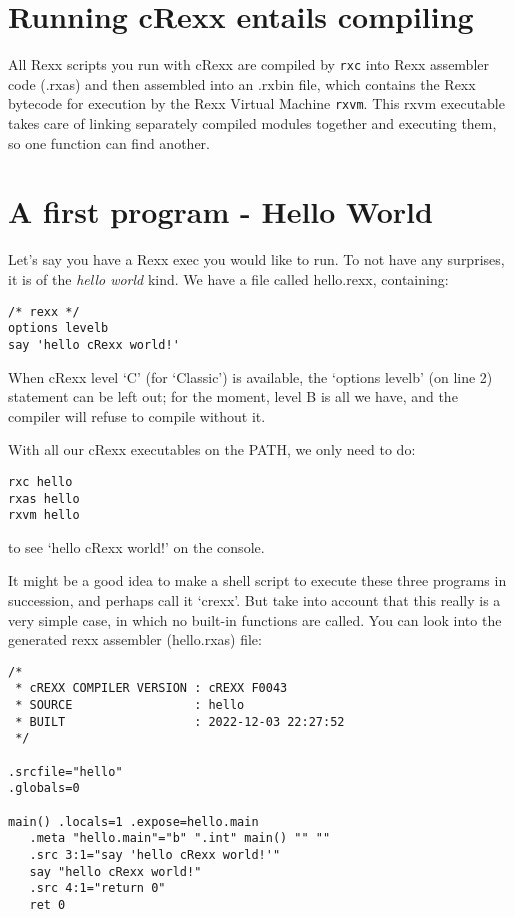 \hypertarget{running-crexx-entails-compiling}{%
\section{Running cRexx entails
compiling}\label{running-crexx-entails-compiling}}

All Rexx scripts you run with cRexx are compiled by \texttt{rxc} into
Rexx assembler code (.rxas) and then assembled into an .rxbin file,
which contains the Rexx bytecode for execution by the Rexx Virtual
Machine \texttt{rxvm}. This rxvm executable takes care of linking
separately compiled modules together and executing them, so one function
can find another.

\hypertarget{a-first-program---hello-world}{%
\section{A first program - Hello
World}\label{a-first-program---hello-world}}

Let's say you have a Rexx exec you would like to run. To not have any
surprises, it is of the \emph{hello world} kind. We have a file called
hello.rexx, containing:

\begin{verbatim}
/* rexx */
options levelb
say 'hello cRexx world!'
\end{verbatim}

When cRexx level `C' (for `Classic') is available, the `options levelb'
(on line 2) statement can be left out; for the moment, level B is all we
have, and the compiler will refuse to compile without it.

With all our cRexx executables on the PATH, we only need to do:

\begin{verbatim}
rxc hello
rxas hello
rxvm hello
\end{verbatim}

to see `hello cRexx world!' on the console.

It might be a good idea to make a shell script to execute these three
programs in succession, and perhaps call it `crexx'. But take into
account that this really is a very simple case, in which no built-in
functions are called. You can look into the generated rexx assembler
(hello.rxas) file:

\begin{verbatim}
/*
 * cREXX COMPILER VERSION : cREXX F0043
 * SOURCE                 : hello
 * BUILT                  : 2022-12-03 22:27:52
 */

.srcfile="hello"
.globals=0

main() .locals=1 .expose=hello.main
   .meta "hello.main"="b" ".int" main() "" ""
   .src 3:1="say 'hello cRexx world!'"
   say "hello cRexx world!"
   .src 4:1="return 0"
   ret 0
\end{verbatim}

